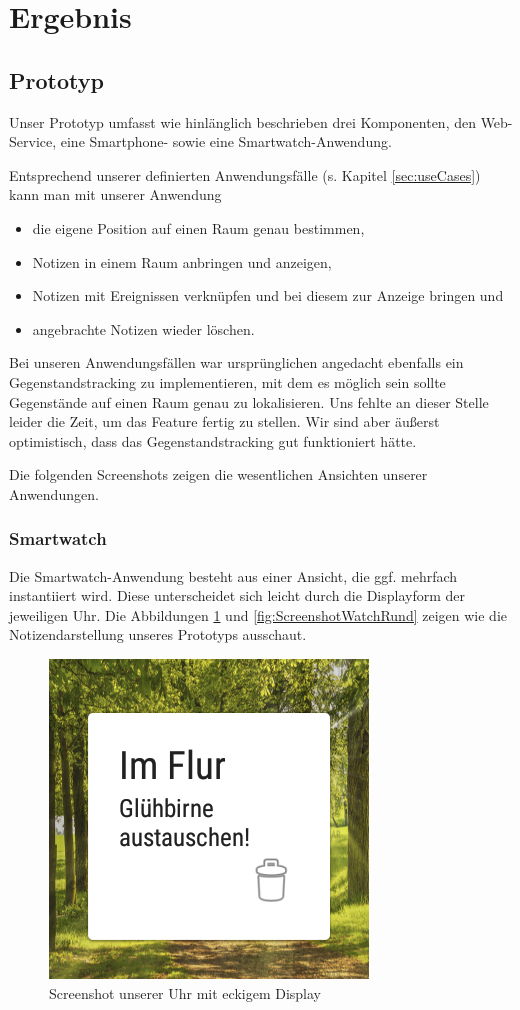 \section{Ergebnis}

\subsection{Prototyp}
\label{sec:prototyp}
Unser Prototyp umfasst wie hinlänglich beschrieben drei Komponenten, den Web-Service, eine Smartphone- sowie eine Smartwatch-Anwendung. 

Entsprechend unserer definierten Anwendungsfälle (s. Kapitel \ref{sec:useCases}) kann man mit unserer Anwendung
\begin{itemize}
\item{die eigene Position auf einen Raum genau bestimmen,}
\item{Notizen in einem Raum anbringen und anzeigen,}
\item{Notizen mit Ereignissen verknüpfen und bei diesem zur Anzeige bringen und}
\item{angebrachte Notizen wieder löschen.} 
\end{itemize}

Bei unseren Anwendungsfällen war ursprünglichen angedacht ebenfalls ein Gegenstandstracking zu implementieren, mit dem es möglich sein sollte Gegenstände auf einen Raum genau zu lokalisieren. Uns fehlte an dieser Stelle leider die Zeit, um das Feature fertig zu stellen. Wir sind aber äußerst optimistisch, dass das Gegenstandstracking gut funktioniert hätte.

Die folgenden Screenshots zeigen die wesentlichen Ansichten unserer Anwendungen.

\subsubsection{Smartwatch}
Die Smartwatch-Anwendung besteht aus einer Ansicht, die ggf. mehrfach instantiiert wird. Diese unterscheidet sich leicht durch die Displayform der jeweiligen Uhr. Die Abbildungen \ref{fig:ScreenshotWatchEckig} und \ref{fig:ScreenshotWatchRund} zeigen wie die Notizendarstellung unseres Prototyps ausschaut.

\begin{figure}[H]
\centering
\includegraphics[width=0.3\linewidth]{../Bilder/ScreenshotWatchEckig}
\caption{Screenshot unserer Uhr mit eckigem Display}
\label{fig:ScreenshotWatchEckig}
\end{figure}

